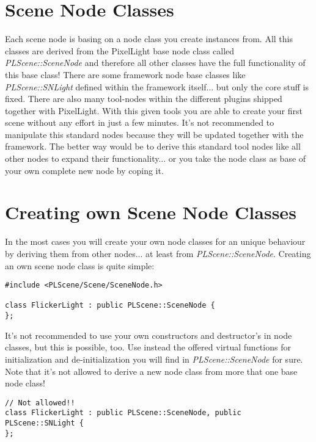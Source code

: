 \section{Scene Node Classes}
Each scene node is basing on a node class you create instances from. All this classes are derived from the PixelLight base node class called \emph{PLScene::SceneNode} and therefore all other classes have the full functionality of this base class! There are some framework node base classes like \emph{PLScene::SNLight} defined within the framework itself... but only the core stuff is fixed. There are also many tool-nodes within the different plugins shipped together with PixelLight. With this given tools you are able to create your first scene without any effort in just a few minutes. It's not recommended to manipulate this standard nodes because they will be updated together with the framework. The better way would be to derive this standard tool nodes like all other nodes to expand their functionality... or you take the node class as base of your own complete new node by coping it.




\section{Creating own Scene Node Classes}
In the most cases you will create your own node classes for an unique behaviour by deriving them from other nodes... at least from \emph{PLScene::SceneNode}. Creating an own scene node class is quite simple:

\begin{lstlisting}[caption=Creating a new own scene node class]
#include <PLScene/Scene/SceneNode.h>

class FlickerLight : public PLScene::SceneNode {
};
\end{lstlisting}

It's not recommended to use your own constructors and destructor's in node classes, but this is possible, too. Use instead the offered virtual functions for initialization and de-initialization you will find in \emph{PLScene::SceneNode} for sure. Note that it's not allowed to derive a new node class from more that one base node class!

\begin{lstlisting}[caption=Invalid scene node class creating]
// Not allowed!!
class FlickerLight : public PLScene::SceneNode, public PLScene::SNLight {
};
\end{lstlisting}


